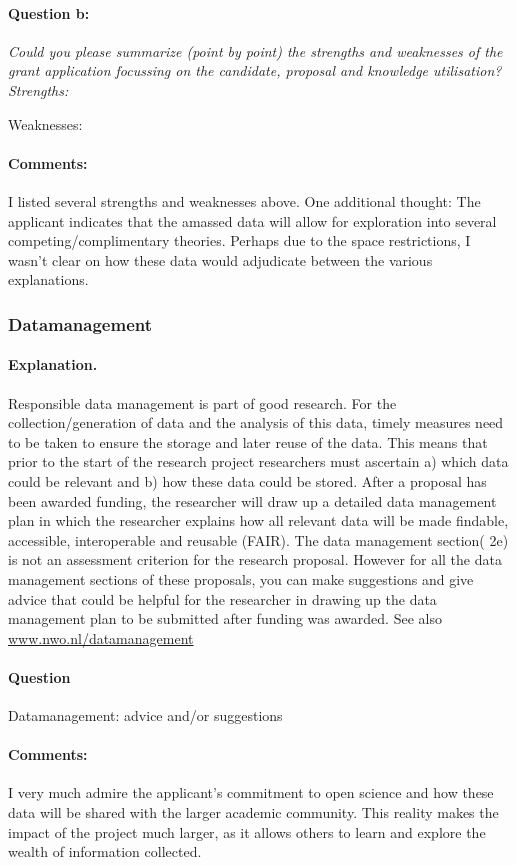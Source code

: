 \documentclass[twocolumn, serif, rga, numeric]{jote-article}
\begin{document}
\paragraph{Question b:}
\textit{Could you please summarize (point by point) the strengths and weaknesses of the grant application focussing on the candidate, proposal and knowledge utilisation? Strengths:}

\noindent Weaknesses:
\paragraph{Comments:}
I listed several strengths and weaknesses above. One additional thought: The applicant indicates that the amassed data will allow for exploration into several competing/complimentary theories. Perhaps due to the space restrictions, I wasn't clear on how these data would adjudicate between the various explanations.
 {}\subsubsection*{Datamanagement} 
\paragraph{Explanation.}
Responsible data management is part of good research. For the collection/generation of data and the analysis of this data, timely measures need to be taken to ensure the storage and later reuse of the data. This means that prior to the start of the research project researchers must ascertain a) which data could be relevant and b) how these data could be stored. After a proposal has been awarded funding, the researcher will draw up a detailed data management plan in which the researcher explains how all relevant data will be made findable, accessible, interoperable and reusable (FAIR). The data management section( 2e) is not an assessment criterion for the research proposal. However for all the data management sections of these proposals, you can make suggestions and give advice that could be helpful for the researcher in drawing up the data management plan to be submitted after funding was awarded. See also \href{www.nwo.nl/datamanagement}{www.nwo.nl/datamanagement}
\paragraph{Question}
Datamanagement: advice and/or suggestions
\paragraph{Comments:}
I very much admire the applicant's commitment to open science and how these data will be shared with the larger academic community. This reality makes the impact of the project much larger, as it allows others to learn and explore the wealth of information collected.
\end{document}

